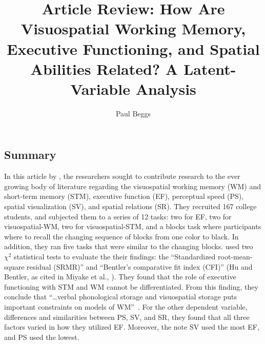 \documentclass[stu,12pt,floatsintext]{apa7}
\title{Article Review: How Are Visuospatial Working Memory, Executive Functioning, and Spatial Abilities Related? A Latent-Variable Analysis} %
\author{Paul Beggs}
\begin{document}
\maketitle %

\subsection{Summary}

In this article by \textcite{miyake2001visuospatial}, the researchers sought to contribute research to the ever growing body of literature regarding the visuospatial working memory (WM) and short-term memory (STM), executive function (EF), perceptual speed (PS), spatial visualization (SV), and spatial relations (SR). They recruited 167 college students, and subjected them to a series of 12 tasks: two for EF, two for visuospatial-WM, two for visuospatial-STM, and a blocks task where participants where to recall the changing sequence of blocks from one color to black. In addition, they ran five tasks that were similar to the changing blocks. \textcite{miyake2001visuospatial} used two \(\chi^2\) statistical tests to evaluate the their findings: the ``Standardized root-mean-square residual (SRMR)'' and ``Bentler's comparative fit index (CFI)'' (Hu and Bentler, \citeyear{hu1998fit} as cited in Miyake et al., \citeyear{miyake2001visuospatial}). They found that the role of executive functioning with STM and WM cannot be differentiated. From this finding, they conclude that ``\dots verbal phonological storage and visuospatial storage puts important constraints on models of WM''~\parencite{miyake2001visuospatial}. For the other dependent variable, differences and similarities between PS, SV, and SR, they found that all three factors varied in how they utilized EF. Moreover, the note SV used the most EF, and PS used the lowest.    

\printbibliography
\end{document}
